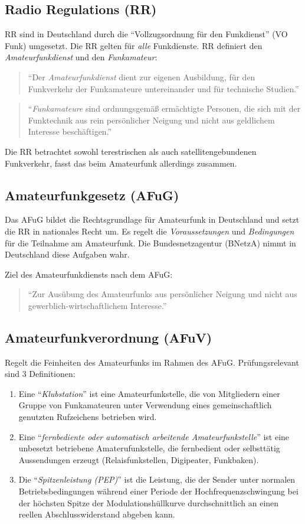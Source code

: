 \documentclass[11pt,BCOR=8.5mm]{scrartcl}
\begin{document}
\subsection{Radio Regulations (RR)}
RR sind in Deutschland durch die "`Vollzugsordnung für den Funkdienst"'
(VO Funk) umgesetzt. Die RR gelten für \emph{alle} Funkdienste.  
RR definiert den \emph{Amateurfunkdienst} und den \emph{Funkamateur}:
\begin{quote}
  "`Der \emph{Amateurfunkdienst} dient zur eigenen Ausbildung, für den
  Funkverkehr der Funkamateure untereinander und für technische
  Studien."'
\end{quote}

\begin{quote}
  "`\emph{Funkamateure} sind ordnungsgemäß ermächtigte Personen, die sich mit
  der Funktechnik aus rein persönlicher Neigung und nicht aus geldlichem
  Interesse beschäftigen."'
\end{quote}

Die RR betrachtet sowohl terestrischen als auch satellitengebundenen
Funkverkehr, fasst das beim Amateurfunk allerdings zusammen.

\subsection{Amateurfunkgesetz (AFuG)}\label{sub:amateurfunkgesetz}
Das AFuG bildet die Rechtsgrundlage für Amateurfunk in Deutschland und
setzt die RR in nationales Recht um. Es regelt die
\emph{Voraussetzungen} und \emph{Bedingungen} für die Teilnahme am
Amateurfunk. Die Bundesnetzagentur (BNetzA) nimmt in Deutschland diese
Aufgaben wahr.

Ziel des Amateurfunkdiensts nach dem AFuG:
\begin{quote}
  "`Zur Ausübung des Amateurfunks aus persönlicher Neigung und nicht aus
  gewerblich-wirtschaftlichem Interesse."'
\end{quote}

\subsection{Amateurfunkverordnung (AFuV)}\label{sub:amateurfunkverordnung}
Regelt die Feinheiten des Amateurfunks im Rahmen des AFuG.
Prüfungsrelevant sind 3 Definitionen:
\begin{enumerate}
  \item Eine "`\emph{Klubstation}"' ist eine Amateurfunkstelle, die von
	Mitgliedern einer Gruppe von Funkamateuren unter Verwendung eines
	gemeinschaftlich genutzten Rufzeichens betrieben wird.
  \item Eine "`\emph{fernbediente oder automatisch arbeitende
	Amateurfunkstelle}"' ist eine unbesetzt betriebene Amaterufunkstelle,
	die fernbedient oder selbsttätig Aussendungen erzeugt
	(Relaisfunkstellen, Digipeater, Funkbaken).
  \item Die "`\emph{Spitzenleistung (PEP)}"' ist die Leistung, die der
	Sender unter normalen Betriebsbedingungen während einer Periode der
	Hochfrequenzschwingung bei der höchsten Spitze der
	Modulationshüllkurve durchschnittlich an einen reellen
	Abschlusswiderstand abgeben kann.
\end{enumerate}
\end{document}
